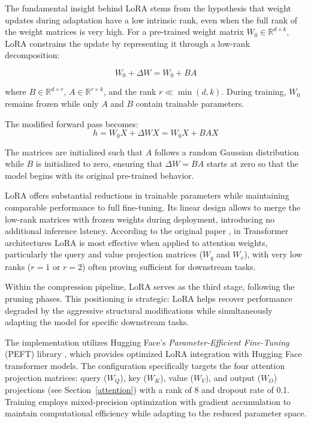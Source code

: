 The fundamental insight behind LoRA stems from the hypothesis that weight updates during adaptation have a low intrinsic rank, even when the full rank of the weight matrices is very high. For a pre-trained weight matrix $W_0 \in \mathbb{R}^{d \times k}$, LoRA constrains the update by representing it through a low-rank decomposition:

\begin{equation}
W_0 + \Delta W = W_0 + BA
\end{equation}

where $B \in \mathbb{R}^{d \times r}$, $A \in \mathbb{R}^{r \times k}$, and the rank $r \ll \min(d,k)$. During training, $W_0$ remains frozen while only $A$ and $B$ contain trainable parameters.

The modified forward pass becomes:
\begin{equation}
h = W_0X + \Delta WX = W_0X + BAX
\end{equation}

The matrices are initialized such that $A$ follows a random Gaussian distribution while $B$ is initialized to zero, ensuring that $\Delta W = BA$ starts at zero so that the model begins with its original pre-trained behavior.

LoRA offers substantial reductions in trainable parameters while maintaining comparable performance to full fine-tuning. Its linear design allows to merge the low-rank matrices with frozen weights during deployment, introducing no additional inference latency. According to the original paper \cite{lora}, in Transformer architectures LoRA is most effective when applied to attention weights, particularly the query and value projection matrices ($W_q$ and $W_v$), with very low ranks ($r=1$ or $r=2$) often proving sufficient for downstream tasks.

Within the compression pipeline, LoRA serves as the third stage, following the pruning phases. This positioning is strategic: LoRA helps recover performance degraded by the aggressive structural modifications while simultaneously adapting the model for specific downstream tasks.

The implementation utilizes Hugging Face's \textit{Parameter-Efficient Fine-Tuning} (PEFT) library \cite{peft}, which provides optimized LoRA integration with Hugging Face transformer models. The configuration specifically targets the four attention projection matrices: query ($W_Q$), key ($W_K$), value ($W_V$), and output ($W_O$) projections (see Section~\ref{attention}) with a rank of 8 and dropout rate of 0.1. Training employs mixed-precision optimization with gradient accumulation to maintain computational efficiency while adapting to the reduced parameter space.

